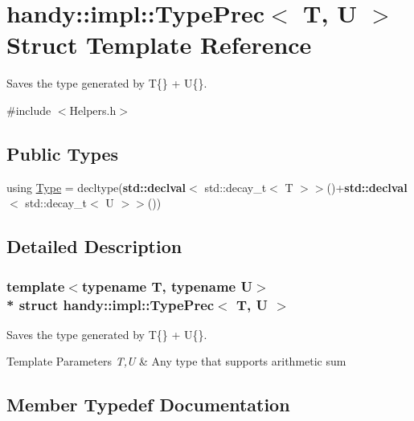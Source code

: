 \hypertarget{structhandy_1_1impl_1_1TypePrec}{}\section{handy\+:\+:impl\+:\+:Type\+Prec$<$ T, U $>$ Struct Template Reference}
\label{structhandy_1_1impl_1_1TypePrec}


Saves the type generated by {\ttfamily T\{\}} + {\ttfamily U\{\}}.  




{\ttfamily \#include $<$Helpers.\+h$>$}

\subsection*{Public Types}
\begin{DoxyCompactItemize}
\item 
using \hyperlink{structhandy_1_1impl_1_1TypePrec_a583c07afc0afda9be823a137bc113020}{Type} = decltype({\bf std\+::declval}$<$ std\+::decay\+\_\+t$<$ T $>$$>$()+{\bf std\+::declval}$<$ std\+::decay\+\_\+t$<$ U $>$$>$())
\end{DoxyCompactItemize}


\subsection{Detailed Description}
\subsubsection*{template$<$typename T, typename U$>$\\*
struct handy\+::impl\+::\+Type\+Prec$<$ T, U $>$}

Saves the type generated by {\ttfamily T\{\}} + {\ttfamily U\{\}}. 


\begin{DoxyTemplParams}{Template Parameters}
{\em T,U} & Any type that supports arithmetic sum \\
\hline
\end{DoxyTemplParams}


\subsection{Member Typedef Documentation}
